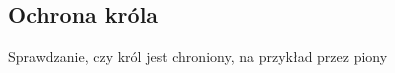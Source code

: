 \subsection{Ochrona króla}
\label{subsec:ochrona-krola}

{
    \color{red}
    \large Sprawdzanie, czy król jest chroniony, na przykład przez piony
}